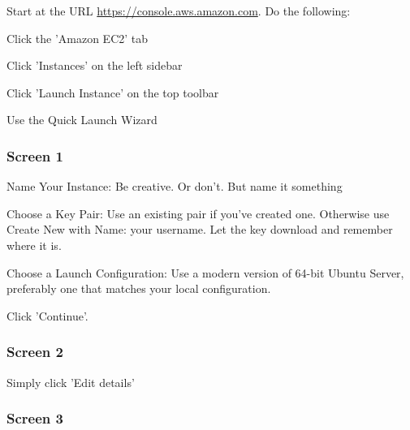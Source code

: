 \documentclass{article}
\begin{document}

Start at the URL \href{https://console.aws.amazon.com}{https://console.aws.amazon.com}. Do the following:

\begin{enumerate*}
\item Click the 'Amazon EC2' tab
\item Click 'Instances' on the left sidebar
\item Click 'Launch Instance' on the top toolbar
\item Use the Quick Launch Wizard
\end{enumerate*}

\subsubsection*{Screen 1}

\begin{enumerate*}
\item Name Your Instance: Be creative. Or don't. But name it something
\item Choose a Key Pair: Use an existing pair if you've created one. Otherwise use Create New with Name: your username. Let the key download and remember where it is.
\item Choose a Launch Configuration: Use a modern version of 64-bit Ubuntu Server, preferably one that matches your local configuration.
\item Click 'Continue'.
\end{enumerate*}

\subsubsection*{Screen 2}

Simply click 'Edit details'

\subsubsection*{Screen 3}
\end{document}
